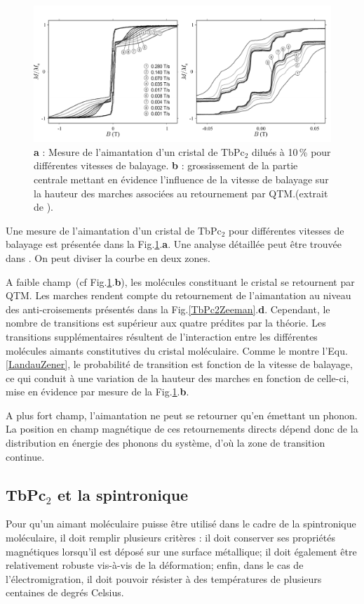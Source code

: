 \begin{figure}
\centering \includegraphics[scale=0.45]{Resultats/MesureAimant/MesureAimant.pdf} 
\caption{\textbf{a} : Mesure de l'aimantation d'un cristal de TbPc$_2$ dilués à 10\,\% pour différentes vitesses de balayage. \textbf{b} : grossissement de la partie centrale mettant en évidence l'influence de la vitesse de balayage sur la hauteur des marches associées au retournement par QTM.(extrait de \cite{Ishikawa2005}).}
\label{TbPc2Aimantation}
\end{figure}


Une mesure de l'aimantation d'un cristal de TbPc$_2$ pour différentes vitesses de balayage est présentée dans la Fig.\ref{TbPc2Aimantation}.\textbf{a}. Une analyse détaillée peut \^etre trouvée dans \cite{Ishikawa2005}. On peut diviser la courbe en deux zones. 

A faible champ~(cf Fig.\ref{TbPc2Aimantation}.\textbf{b}), les molécules constituant le cristal se retournent par QTM. Les marches rendent compte du retournement de l'aimantation au niveau des anti-croisements présentés dans la Fig.\ref{TbPc2Zeeman}.\textbf{d}. Cependant, le nombre de transitions est supérieur aux quatre prédites par la théorie. Les transitions supplémentaires résultent de l'interaction entre les différentes molécules aimants constitutives du cristal moléculaire. Comme le montre l'Equ.\ref{LandauZener}, le probabilité de transition est fonction de la vitesse de balayage, ce qui conduit à une variation de la hauteur des marches en fonction de celle-ci, mise en évidence par mesure de la Fig.\ref{TbPc2Aimantation}.\textbf{b}. 

A plus fort champ, l'aimantation ne peut se retourner qu'en émettant un phonon. La position en champ magnétique de ces retournements directs dépend donc de la distribution en énergie des phonons du système, d'où la zone de transition continue.

\subsection{TbPc$_2$ et la spintronique}
Pour qu'un aimant moléculaire puisse être utilisé dans le cadre de la spintronique moléculaire, il doit remplir plusieurs critères : il doit conserver ses propriétés magnétiques lorsqu'il est déposé sur une surface métallique; il doit également être relativement robuste vis-à-vis de la déformation; enfin, dans le cas de l'électromigration, il doit pouvoir résister à des températures de plusieurs centaines de degrés Celsius.

